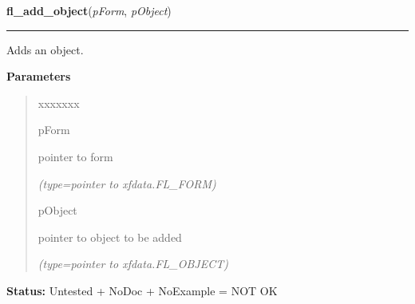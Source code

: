 \hspace{.8\funcindent}\begin{boxedminipage}{\funcwidth}

    \raggedright \textbf{fl\_add\_object}(\textit{pForm}, \textit{pObject})

    \vspace{-1.5ex}

    \rule{\textwidth}{0.5\fboxrule}
\setlength{\parskip}{2ex}
    Adds an object.

\setlength{\parskip}{1ex}
      \textbf{Parameters}
      \vspace{-1ex}

      \begin{quote}
        \begin{Ventry}{xxxxxxx}

          \item[pForm]

          pointer to form

            {\it (type=pointer to xfdata.FL\_FORM)}

          \item[pObject]

          pointer to object to be added

            {\it (type=pointer to xfdata.FL\_OBJECT)}

        \end{Ventry}

      \end{quote}

\textbf{Status:} Untested + NoDoc + NoExample = NOT OK



    \end{boxedminipage}

    \label{xformslib:library:fl_addto_form}

    \vspace{0.5ex}

